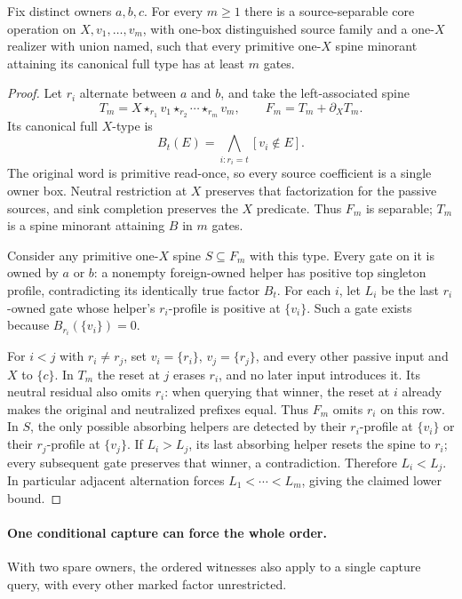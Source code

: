 \begin{proposition}
\label{core:prop:ordered-reset-witnesses}
Fix distinct owners $a,b,c$. For every $m\geq1$ there is a
source-separable core operation on $X,v_1,\ldots,v_m$, with one-box
distinguished source family and a one-$X$ realizer with union named,
such that every primitive one-$X$ spine minorant attaining its canonical
full type has at least $m$ gates.
\end{proposition}
\begin{proof}
Let $r_i$ alternate between $a$ and $b$, and take the left-associated
spine
\[
 T_m=X\star_{r_1}v_1\star_{r_2}\cdots\star_{r_m}v_m,
 \qquad F_m=T_m+\partial_XT_m.
\]
Its canonical full $X$-type is
\[
 B_t(E)=\bigwedge_{i:r_i=t}[v_i\notin E].
\]
The original word is primitive read-once, so every source coefficient
is a single owner box. Neutral restriction at $X$ preserves that
factorization for the passive sources, and sink completion preserves
the $X$ predicate. Thus $F_m$ is separable; $T_m$ is a spine minorant
attaining $B$ in $m$ gates.

Consider any primitive one-$X$ spine $S\subseteq F_m$ with this type.
Every gate on it is owned by $a$ or $b$: a nonempty foreign-owned
helper has positive top singleton profile, contradicting its
identically true factor $B_t$. For each $i$, let $L_i$ be the last
$r_i$-owned gate whose helper's $r_i$-profile is positive at
$\{v_i\}$. Such a gate exists because $B_{r_i}(\{v_i\})=0$.

For $i<j$ with $r_i\ne r_j$, set $v_i=\{r_i\}$,
$v_j=\{r_j\}$, and every other passive input and $X$ to $\{c\}$.
In $T_m$ the reset at $j$ erases $r_i$, and no later input introduces
it. Its neutral residual also omits $r_i$: when querying that winner,
the reset at $i$ already makes the original and neutralized prefixes
equal. Thus $F_m$ omits $r_i$ on this row.
In $S$, the only possible absorbing helpers are detected by their
$r_i$-profile at $\{v_i\}$ or their $r_j$-profile at $\{v_j\}$.
If $L_i>L_j$, its last absorbing helper resets the spine to $r_i$;
every subsequent gate preserves that winner, a contradiction.
Therefore $L_i<L_j$. In particular adjacent alternation forces
$L_1<\cdots<L_m$, giving the claimed lower bound.
\end{proof}

\paragraph{One conditional capture can force the whole order.}
With two spare owners, the ordered witnesses also apply to a single
capture query, with every other marked factor unrestricted.

